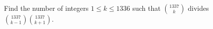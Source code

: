 Find the number of integers $1\leq k\leq1336$ such that $\binom{1337}{k}$ divides $\binom{1337}{k-1}\binom{1337}{k+1}$.
